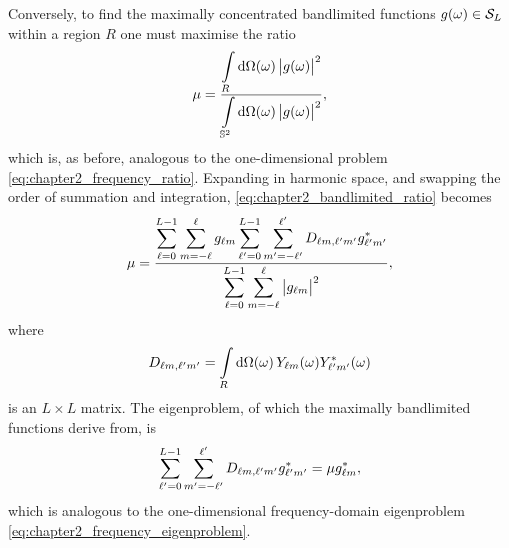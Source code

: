 Conversely, to find the maximally concentrated bandlimited functions \(\pixel{g} \in \spaceBandlimit{}\) within a region \(R\) one must maximise the ratio
%
\begin{equation}\label{eq:chapter2_bandlimited_ratio}
	\mu
	= \frac{\integrateRegion{\sphereVolume} \abs{\pixel{g}}^{2}}
	{\integrateSphere{\omega} \abs{\pixel{g}}^{2}},
\end{equation}
%
which is, as before, analogous to the one-dimensional problem \cref{eq:chapter2_frequency_ratio}.
Expanding in harmonic space, and swapping the order of summation and integration, \cref{eq:chapter2_bandlimited_ratio} becomes
%
\begin{equation}
	\mu
	= \frac{\displaystyle\sum\limits_{\ell=0}^{L-1} \sum\limits_{m=-\ell}^{\ell} \harmonic{g}
		\sum\limits_{\ell'=0}^{L-1} \sum\limits_{m'=-\ell'}^{\ell'} \Dmatrix \conj{\harmonic[']{g}}}
	{\displaystyle\sum\limits_{\ell=0}^{L-1} \sum\limits_{m=-\ell}^{\ell} \abs{\harmonic{g}}^{2}},
\end{equation}
%
where
%
\begin{equation}
	\Dmatrix
	= \integrateRegion{\sphereVolume} \pixel{\harmonic{Y}} \pixel{\conj{\harmonic[']{Y}}}
\end{equation}
%
is an \(L \times L\) matrix.
The eigenproblem, of which the maximally bandlimited functions derive from, is
%
\begin{equation}
	\sum\limits_{\ell'=0}^{L-1} \sum\limits_{m'=-\ell'}^{\ell'} \Dmatrix \conj{\harmonic[']{g}}
	= \mu \conj{\harmonic{g}},
\end{equation}
%
which is analogous to the one-dimensional frequency-domain eigenproblem \cref{eq:chapter2_frequency_eigenproblem}.

